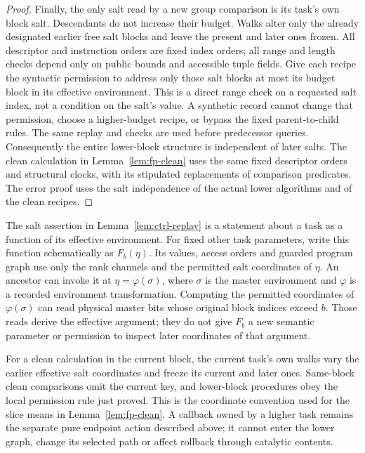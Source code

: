 \begin{proof}
Finally, the only salt read by a new group comparison is its task's
own block salt.  Descendants do not increase their budget.  Walks alter
only the already designated earlier free salt blocks and leave the
present and later ones frozen.  All descriptor and instruction orders
are fixed index orders; all range and length checks depend only on
public bounds and accessible tuple fields.  Give each recipe the
syntactic permission to address only those salt blocks at most its
budget block in its effective environment.  This is a direct range check
on a requested salt index,
not a condition on the salt's value.  A synthetic record cannot change
that permission, choose a higher-budget recipe, or bypass the fixed
parent-to-child rules.  The same replay and checks are used before
predecessor queries.  Consequently the entire lower-block structure is
independent of later salts.  The clean calculation in
Lemma~\ref{lem:fp-clean} uses the same fixed descriptor orders and
structural clocks, with its stipulated replacements of comparison
predicates.  The error proof uses the salt independence of the actual lower
algorithms and of the clean recipes.
\end{proof}

\begin{remark}
\label{rem:ctrl-effective-environment}
The salt assertion in Lemma~\ref{lem:ctrl-replay} is a statement about a
task as a function of its effective environment.  For fixed other task
parameters, write this function schematically as $F_b(\eta)$.  Its
values, access orders and guarded program graph use only the rank
channels and the permitted salt coordinates of $\eta$.  An ancestor can
invoke it at $\eta=\varphi(\sigma)$, where $\sigma$ is the master
environment and $\varphi$ is a recorded environment transformation.
Computing the permitted coordinates of $\varphi(\sigma)$ can read
physical master bits whose original block indices exceed $b$.  Those
reads derive the effective argument; they do not give $F_b$ a new
semantic parameter or permission to inspect later coordinates of that
argument.

For a clean calculation in the current block, the current task's own
walks vary the earlier effective salt coordinates and freeze its current
and later ones.  Same-block clean comparisons omit the current key, and
lower-block procedures obey the local permission rule just proved.
This is the coordinate convention used for the slice means in
Lemma~\ref{lem:fp-clean}.  A callback owned by a higher task remains the
separate pure endpoint action described above; it cannot enter the lower
graph, change its selected path or affect rollback through catalytic
contents.
\end{remark}

